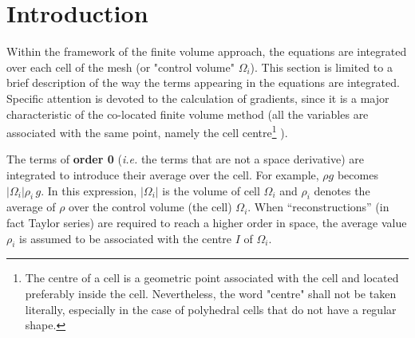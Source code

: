 
%
%
%
%


\section{Introduction}

Within the framework of the finite volume approach, the equations are
integrated over each cell of the mesh (or "control volume" $\Omega_i$). 
This section is limited to a brief description of the way the terms appearing in
the equations are integrated. Specific attention is devoted to the
calculation of gradients, since it is a major characteristic of the
co-located finite volume method (all the variables are associated with the
same point, namely the cell centre\footnote{%
The centre of a cell is a geometric point associated with the cell and
located preferably inside the cell. Nevertheless, the word "centre" shall
not be taken literally,
especially in the case of polyhedral cells that do not have a regular shape.}%
).

The terms of \textbf{order 0} (\emph{i.e.} the terms that are not a space
derivative) are integrated to introduce their average over the cell. For
example, $\rho g$ becomes $|\Omega _{i}|\rho_{i}\,g$. 
In this expression, $|\Omega _{i}|$ is the volume of cell $\Omega _{i}$ and 
$\rho_{i}$ denotes the average of $\rho $ over the control volume
(the cell) $\Omega _{i}$. When
``reconstructions'' (in fact Taylor series) are required to reach a higher
order in space, the average value $\rho_{i}$ is assumed to be associated
with the centre $I$ of $\Omega _{i}$.

